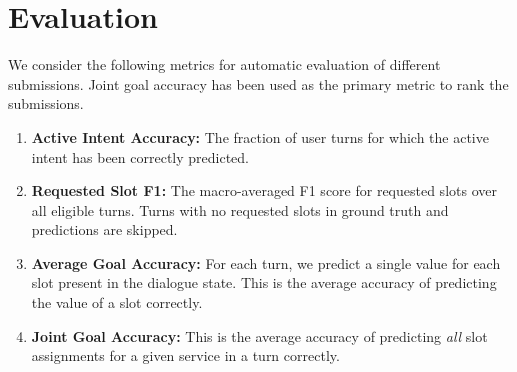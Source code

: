 \section{Evaluation}
We consider the following metrics for automatic evaluation of different submissions. Joint goal accuracy has been used as the primary metric to rank the submissions.

\begin{enumerate}
    \item \textbf{Active Intent Accuracy:} The fraction of user turns for which the active intent has been correctly predicted.
    \item \textbf{Requested Slot F1:} The macro-averaged F1 score for requested slots over all eligible turns. Turns with no requested slots in ground truth and predictions are skipped.
    \item \textbf{Average Goal Accuracy:} For each turn, we predict a single value for each slot present in the dialogue state. This is the average accuracy of predicting the value of a slot correctly.
    \item \textbf{Joint Goal Accuracy:} This is the average accuracy of predicting \textit{all} slot assignments for a given service in a turn correctly. 
\end{enumerate}

